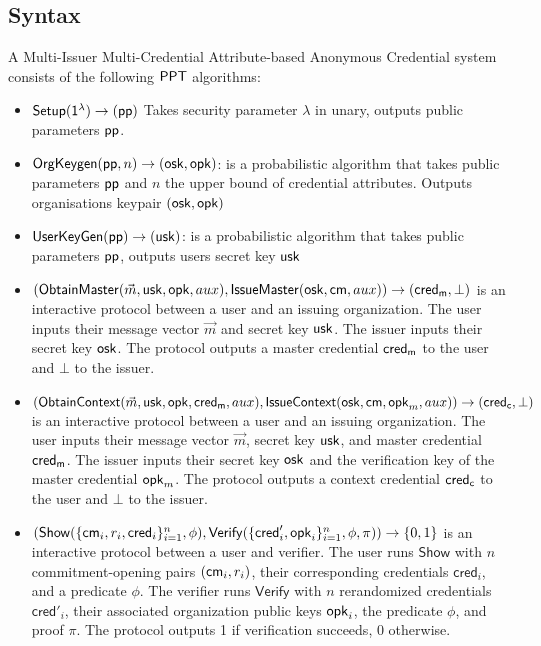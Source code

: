 \subsection{Syntax}
\begin{definition} A Multi-Issuer Multi-Credential Attribute-based Anonymous Credential system consists of the following $\mathsf{PPT}$ algorithms:
    \begin{itemize}
    \item $\mathsf{Setup}(\mathsf{1^{\lambda}}) \to (\mathsf{pp})$ Takes security parameter $\lambda$ in unary, outputs public parameters $\mathsf{pp}$.

    \item $\mathsf{OrgKeygen}(\mathsf{pp}, n) \to (\mathsf{osk}, \mathsf{opk})$: is a probabilistic algorithm that takes public parameters $\mathsf{pp}$ and $n$ the upper bound of credential attributes. Outputs organisations keypair $(\mathsf{osk}, \mathsf{opk})$

    \item $\mathsf{UserKeyGen}(\mathsf{pp}) \to (\mathsf{usk})$: is a probabilistic algorithm that takes public parameters $\mathsf{pp}$, outputs users secret key $\mathsf{usk}$

    \item $(\mathsf{ObtainMaster}(\vec{m}, \mathsf{usk}, \mathsf{opk}, aux), \mathsf{IssueMaster}(\mathsf{osk}, \mathsf{cm}, aux)) \rightarrow (\mathsf{cred_m}, \bot)$ is an interactive protocol between a user and an issuing organization. The user inputs their message vector $\vec{m}$ and secret key $\mathsf{usk}$. The issuer inputs their secret key $\mathsf{osk}$. The protocol outputs a master credential $\mathsf{cred_m}$ to the user and $\bot$ to the issuer.

    \item $(\mathsf{ObtainContext}(\vec{m}, \mathsf{usk}, \mathsf{opk}, \mathsf{cred_m}, aux), \mathsf{IssueContext}(\mathsf{osk}, \mathsf{cm}, \mathsf{opk}_m, aux)) \rightarrow (\mathsf{cred_c}, \bot)$ is an interactive protocol between a user and an issuing organization. The user inputs their message vector $\vec{m}$, secret key $\mathsf{usk}$, and master credential $\mathsf{cred_m}$. The issuer inputs their secret key $\mathsf{osk}$ and the verification key of the master credential $\mathsf{opk}_m$. The protocol outputs a context credential $\mathsf{cred_c}$ to the user and $\bot$ to the issuer.

    \item $(\mathsf{Show}(\{\mathsf{cm}_i, r_i, \mathsf{cred}_i\}_{i=1}^n, \phi), \mathsf{Verify}(\{\mathsf{cred}'_i, \mathsf{opk}_i\}_{i=1}^n, \phi, \pi)) \rightarrow \{0,1\}$ is an interactive protocol between a user and verifier. The user runs $\mathsf{Show}$ with $n$ commitment-opening pairs $(\mathsf{cm}_i, r_i)$, their corresponding credentials $\mathsf{cred}_i$, and a predicate $\phi$. The verifier runs $\mathsf{Verify}$ with $n$ rerandomized credentials $\mathsf{cred}'_i$, their associated organization public keys $\mathsf{opk}_i$, the predicate $\phi$, and proof $\pi$. The protocol outputs 1 if verification succeeds, 0 otherwise.
\end{itemize}
\end{definition}



